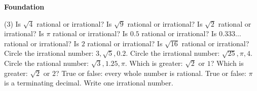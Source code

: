 \documentclass[17pt,a4paper,landscape]{extarticle}
\begin{document}
\sffamily
\boldmath

\boldmath

{\LARGE \textbf{Foundation}}
\begin{tasks}(3)
\task Is \mbox{$\sqrt{4}$} rational or irrational?
\task Is \mbox{$\sqrt{9}$} rational or irrational?
\task Is \mbox{$\sqrt{2}$} rational or irrational?
\task Is \mbox{$\pi$} rational or irrational?
\task Is \mbox{$0.5$} rational or irrational?
\task Is \mbox{$0.333\ldots$} rational or irrational?
\task Is \mbox{$2$} rational or irrational?
\task Is \mbox{$\sqrt{16}$} rational or irrational?
\task Circle the irrational number: \mbox{$3, \sqrt{5}, 0.2$}.
\task Circle the irrational number: \mbox{$\sqrt{25}, \pi, 4$}.
\task Circle the rational number: \mbox{$\sqrt{3}, 1.25, \pi$}.
\task Which is greater: \mbox{$\sqrt{2}$} or \mbox{$1$}?
\task Which is greater: \mbox{$\sqrt{2}$} or \mbox{$2$}?
\task True or false: every whole number is rational.
\task True or false: \mbox{$\pi$} is a terminating decimal.
\task Write one irrational number.
\end{tasks}
\end{document}

